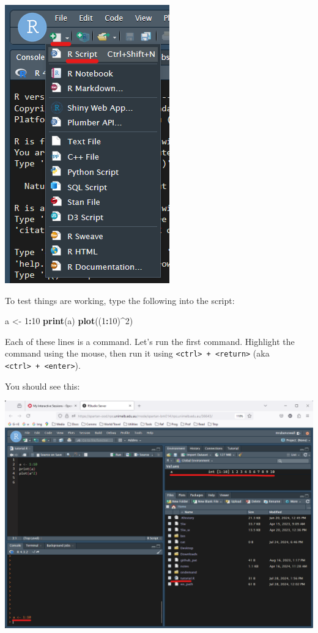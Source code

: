 \documentclass[
]{article}
\newenvironment{Shaded}{\begin{snugshade}}{\end{snugshade}}
\newcommand{\DecValTok}[1]{\textcolor[rgb]{0.00,0.00,0.81}{#1}}
\newcommand{\FunctionTok}[1]{\textcolor[rgb]{0.13,0.29,0.53}{\textbf{#1}}}
\newcommand{\NormalTok}[1]{#1}
\newcommand{\OtherTok}[1]{\textcolor[rgb]{0.56,0.35,0.01}{#1}}
\newcommand{\SpecialCharTok}[1]{\textcolor[rgb]{0.81,0.36,0.00}{\textbf{#1}}}
\begin{document}
\includegraphics{images/Rscript.png}

To test things are working, type the following into the script:

\begin{Shaded}
\begin{Highlighting}[]
\NormalTok{a }\OtherTok{\textless{}{-}} \DecValTok{1}\SpecialCharTok{:}\DecValTok{10}
\FunctionTok{print}\NormalTok{(a)}
\FunctionTok{plot}\NormalTok{((}\DecValTok{1}\SpecialCharTok{:}\DecValTok{10}\NormalTok{)}\SpecialCharTok{\^{}}\DecValTok{2}\NormalTok{)}
\end{Highlighting}
\end{Shaded}

Each of these lines is a command. Let's run the first command. Highlight
the command using the mouse, then run it using
\texttt{\textless{}ctrl\textgreater{}\ +\ \textless{}return\textgreater{}}
(aka
\texttt{\textless{}ctrl\textgreater{}\ +\ \textless{}enter\textgreater{}}).

You should see this:

\includegraphics{images/RfirstRun.png}
\end{document}
